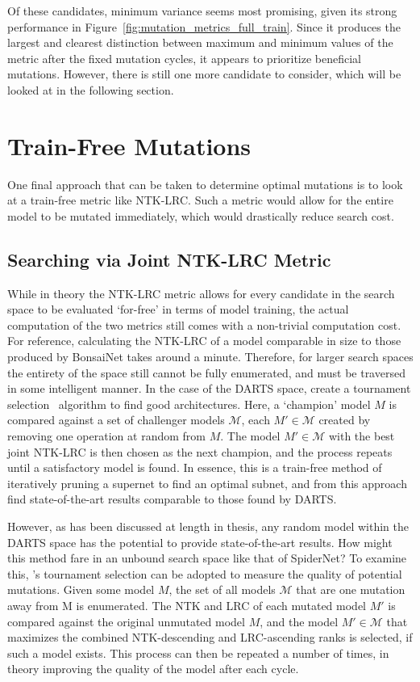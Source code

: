 Of these candidates, minimum variance seems most promising, given its strong performance
in Figure~\ref{fig:mutation_metrics_full_train}. Since it produces the largest and clearest
distinction between maximum and minimum values of the metric after the fixed mutation cycles, it appears to
prioritize beneficial mutations. However, there is still one more candidate to consider, which will be looked
at in the following section.

\section{Train-Free Mutations}\label{sect:spider_tf_mutations}
One final approach that can be taken to determine optimal mutations is to look at a train-free metric like NTK-LRC.
Such a metric would allow for the entire model to be mutated immediately, which would
drastically reduce search cost.

\subsection{Searching via Joint NTK-LRC Metric} \label{sect:ntk_metric}
While in theory the NTK-LRC metric allows for every candidate in the search space to be evaluated `for-free' in terms of model
training, the actual computation of the two metrics still comes with a non-trivial computation cost. For reference, calculating
the NTK-LRC of a model comparable in size to those produced by BonsaiNet takes around a minute. Therefore, for larger
search spaces the entirety of the space still cannot be fully enumerated, and must be traversed in some intelligent manner.
In the case of the DARTS space, \cite{chen2021} create a tournament selection~\citep{miller1995} algorithm to find good architectures.
Here, a `champion' model $M$ is compared against a set of challenger models $\mathcal{M}$, each $M'\in\mathcal{M}$ created
by removing one operation at random from $M$. The model $M'\in\mathcal{M}$ with the best joint NTK-LRC is then chosen as
the next champion, and the process repeats until a satisfactory model is found. In essence, this is a train-free method
of iteratively pruning a supernet to find an optimal subnet, and from this approach \citeauthor{chen2021} find state-of-the-art
results comparable to those found by DARTS.

However, as has been discussed at length in thesis, any random model within the DARTS space has the potential to provide
state-of-the-art results. How might this method fare in an unbound search space like that of SpiderNet? To examine this,
\citeauthor{chen2021}'s tournament selection can be adopted to measure the quality of potential mutations. Given some
model $M$, the set of all models $\mathcal{M}$ that are one mutation away from M is enumerated. The NTK and LRC of
each mutated model $M'$ is compared against the original unmutated model $M$, and the model $M' \in \mathcal{M}$ that
maximizes the combined NTK-descending and LRC-ascending ranks is selected, if such a model exists. This process can then
be repeated a number of times, in theory improving the quality of the model after each cycle.

